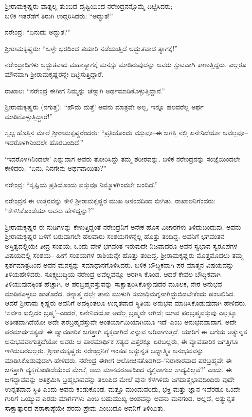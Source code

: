 ಶ್ರೀರಾಮಕೃಷ್ಣರು ವಾತ್ಸಲ್ಯ ತುಂಬಿದ ದೃಷ್ಟಿಯಿಂದ ನರೇಂದ್ರನನ್ನೊಮ್ಮೆ ದಿಟ್ಟಿಸಿದರು;\\ಬಳಿಕ ಇತರೆಡೆಗೆ ತಿರುಗಿ ಉದ್ಗರಿಸಿದರು: “ಅದ್ಭುತ!”

ನರೇಂದ್ರ: “ಏನುದು ಅದ್ಭುತ?”

ಶ್ರೀರಾಮಕೃಷ್ಣರು: “ಒಳ್ಳೇ ಭರದಿಂದ ತಯಾರಿ ನಡೆಯುತ್ತಿದೆ ಅದ್ಭುತವಾದ ತ್ಯಾಗಕ್ಕೆ!”

ನರೇಂದ್ರಾದಿಗಳು ಅದ್ಭುತವಾದ ಮಹಾತ್ಯಾಗಕ್ಕೆ ಮನಸ್ಸು ಮಾಡಿರುವುದನ್ನು ಅವರು ಸ್ಫುಟವಾಗಿ ಕಾಣುತ್ತಿದ್ದರು. ಎಲ್ಲರೂ ಮೌನವಾಗಿ ಶ್ರೀರಾಮಕೃಷ್ಣರನ್ನೇ ದಿಟ್ಟಿಸುತ್ತಿದ್ದಾರೆ.

ರಾಖಾಲ: “ನರೇಂದ್ರ ಈಗೀಗ ನಿಮ್ಮನ್ನು ಚೆನ್ನಾಗಿ ಅರ್ಥಮಾಡಿಕೊಳ್ಳುತ್ತಿದ್ದಾನೆ.”

ಶ್ರೀರಾಮಕೃಷ್ಣರು (ನಗುತ್ತ): “ಹೌದು ಮತ್ತೆ! ಅವನು ಮಾತ್ರವೇ ಅಲ್ಲ, ಇನ್ನೂ ಹಲವರೆಲ್ಲ ಅರ್ಥ ಮಾಡಿಕೊಳ್ಳುತ್ತಿದ್ದಾರೆ!”

ಸ್ವಲ್ಪ ಹೊತ್ತಿನ ಮೇಲೆ ಶ್ರೀರಾಮಕೃಷ್ಣರೆಂದರು: “ಪ್ರತಿಯೊಂದು ವಸ್ತುವೂ–ಈ ಜಗತ್ತಿ ನಲ್ಲಿ ಏನೇನಿದೆಯೋ ಅವೆಲ್ಲವೂ–ಇದರೊಳಗಿನಿಂದಲೇ ಹೊರಬಂದಿದೆ.”

‘ಇದರೊಳಗಿನಿಂದಲೇ’ ಎನ್ನುವಾಗ ಅವರು ತೋರಿಸಿದ್ದು ತಮ್ಮ ಶರೀರವನ್ನು. ಬಳಿಕ ನರೇಂದ್ರನನ್ನು ಸಂಜ್ಞೆಯಿಂದಲೇ ಕೇಳಿದರು: “ಏನು, ನಿನಗೇನು ಅರ್ಥವಾಯಿತು?”

ನರೇಂದ್ರ: “ಸೃಷ್ಟಿಯ ಪ್ರತಿಯೊಂದು ವಸ್ತುವೂ ನಿಮ್ಮೊಳಗಿಂದಲೇ ಬಂದಿದೆ.”

ನರೇಂದ್ರನ ಈ ಉತ್ತರವನ್ನು ಕೇಳಿ ಶ್ರೀರಾಮಕೃಷ್ಣರ ಮುಖ ಆನಂದದಿಂದ ಬೀಗಿತು. ರಾಖಾಲನಿಗೆಂದರು: “ಕೇಳಿಸಿಕೊಂಡೆಯಾ ಅವನು ಹೇಳಿದ್ದನ್ನು?”

ಶ್ರೀರಾಮಕೃಷ್ಣರ ಈ ನುಡಿಗಳನ್ನು ಕೇಳುತ್ತಿದ್ದಂತೆ ನರೇಂದ್ರನಿಗೆ ಅನೇಕ ಹೊಸ ವಿಚಾರಗಳು ತಿಳಿದುಬಂದುವು. ಅವನು ಶ್ರೀರಾಮಕೃಷ್ಣರ ಬಳಿಗೆ ಬರುವಾಗಲೇ ಹಲವಾರು ಸಂಶಯಗಳನ್ನೆಲ್ಲ ಹೊತ್ತು ತಂದಿದ್ದ. ಅವನಿಗೆ ಭಗವಂತನ ಅಸ್ತಿತ್ವದಲ್ಲಿಯೇ ತೀವ್ರ ಸಂಶಯ; ಒಂದು ವೇಳೆ ಭಗವಂತ ಇರುವುದೇ ನಿಜವಾದರೂ ಅವನ ಸ್ವಭಾವ-ಸ್ವರೂಪಗಳ ವಿಷಯದಲ್ಲಿ ಸಂಶಯ– ಹೀಗೆ ಸಂಶಯಗಳ ರಾಶಿಯನ್ನೇ ಹೊತ್ತು ತಂದಿದ್ದ. ಶ್ರೀರಾಮಕೃಷ್ಣರು ಮೊತ್ತಮೊದಲು ತಮ್ಮ ಸ್ಪರ್ಶಮಾತ್ರದಿಂದ ಅವನ ಮನಸ್ಸನ್ನು ಸಮಾಧಾನಗೊಳಿಸಿದರು. ಬಳಿಕ ಬೌದ್ಧಿಕವಾಗಿ ಪರ ಮಾತ್ಮನ ವಿಷಯವನ್ನು ತಿಳಿಯಹೇಳಿದರು. ಸೂಕ್ಷ್ಮಬುದ್ಧಿಯ ನರೇಂದ್ರ ಅವೆಲ್ಲವನ್ನೂ ಅರಗಿಸಿ ಕೊಂಡ. ಆದರೆ ಕೇವಲ ಬೌದ್ಧಿಕವಾಗಿ ತಿಳಿಯುವುದಕ್ಕಿಂತ ಹೆಚ್ಚಾಗಿ, ಆ ಪರಬ್ರಹ್ಮವಸ್ತುವನ್ನು ಸಾಕ್ಷಾತ್ಕರಿಸಿಕೊಳ್ಳುವುದರ ಮೂಲಕ, ನೇರ ಅನುಭವ ಮಾಡಿಕೊಳ್ಳಲು ಹಾತೊರೆದ. ತನ್ನಾತ್ಮ ದಲ್ಲೇ ತಾನು ಮುಳುಗಿ ಸಮಾಧಿಮಗ್ನನಾಗಿದ್ದುಬಿಡಬೇಕೆಂದು ಹಂಬಲಿಸಿದ. ಆದರೆ ಶ್ರೀರಾಮ ಕೃಷ್ಣರು ಅವನಿಗೆ ಅದಕ್ಕಿಂತಲೂ ಉನ್ನತವಾದ ಸ್ಥಿತಿಯ ಅನುಭವ ಮಾಡಿಸಿಕೊಡುವುದಾಗಿ ಹೇಳಿದರು. ‘ಸರ್ವಂ ಖಲ್ವಿದಂ ಬ್ರಹ್ಮ’–ಎಂದರೆ, ಏನೇನಿದೆಯೋ ಅದೆಲ್ಲ ಬ್ರಹ್ಮವೇ ಆಗಿದೆ; ಯಾವ ಪರಬ್ರಹ್ಮವಸ್ತುವು ಎಲ್ಲಕ್ಕೂ ಅತೀತವಾಗಿದೆಯೋ ಅದೇ ಪರಬ್ರಹ್ಮವಸ್ತುವೇ ಅಂತರ್ಯಾಮಿಯಾಗಿಯೂ ಇದೆ–ಎಂಬ ಅನುಭವವಾದಾಗ, ಅದೇ ಪರಮಾರ್ಥಸತ್ಯವೇ ಈ ವ್ಯಾವಹಾರಿಕ ಜಗತ್ತಾಗಿ ವ್ಯಕ್ತವಾಗಿದೆ ಎನ್ನುವ ಅರಿವಾಗುತ್ತದೆ. ಯಾರಿಗೆ ಈ ಬಗೆಯ ಅತ್ಯುನ್ನತ ಅನುಭವವಾಗುತ್ತದೆಯೋ ಅವರು ಆ ಪಾರಮಾರ್ಥಿಕ ಸತ್ಯದ ಎತ್ತರಕ್ಕೂ ಏರಬಲ್ಲರು, ಈ ವ್ಯಾವಹಾರಿಕ ಜಗತ್ತಿಗೂ ಇಳಿದುಬರಬಲ್ಲರು. ಶ್ರೀರಾಮಕೃಷ್ಣರು ನರೇಂದ್ರನಿಗೆ ಇಂತಹ ಅತ್ಯುನ್ನತ ಆಧ್ಯಾತ್ಮಿಕ ಅನುಭವವನ್ನು ಮಾಡಿಸಿಕೊಡುವುದಾಗಿ ಹೇಳಿದರು. ನರೇಂದ್ರ ಈಗೀಗ ಆಲೋಚಿಸತೊಡಗಿದ–‘ನಿರಾಕಾರವಾದ ಪರಬ್ರಹ್ಮವೇ ಈ ಜಗತ್ತಾಗಿ ವ್ಯಕ್ತಗೊಂಡಿದೆಯೆಂದ ಮೇಲೆ, ಅದು ಮಾನವರೂಪದಿಂದ ವ್ಯಕ್ತವಾಗಲು ಸಾಧ್ಯವಿಲ್ಲವೆ?’ ಎಂದು. ಈ ಜಗದ್ಭಾವವನ್ನು ಅತಿಕ್ರಮಿಸಿ ಬ್ರಹ್ಮಭಾವವನ್ನು ತಲುಪಿದ ಮೇಲೆ ಪುನಃ ಕೆಳಗಿಳಿದು ಜಗದಾತ್ಮಭಾವದಿಂದಿರು ವುದೇ ಉನ್ನತವಾದ ಸ್ಥಿತಿ ಎಂದು ಅವನು ಕಂಡುಕೊಂಡ. ಮತ್ತೂ ಮುಂದುವರಿದು, ಭಕ್ತಿ ಮತ್ತು ಜ್ಞಾನ ಇವೆರಡೂ ಒಂದೇ ಗುರಿಗೆ ಒಯ್ಯುವ ಎರಡು ಮಾರ್ಗಗಳು ಎಂಬ ಬಹುಮುಖ್ಯ ಅಂಶವನ್ನು ಅವನು ಮನಗಂಡ. ಅಲ್ಲದೆ, ಅತ್ಯುನ್ನತ ಸಾಕ್ಷಾತ್ಕಾರದ ಪರಾಕಾಷ್ಠೆಯೇ ಪರಮ ಪ್ರೇಮ ಎಂಬುದೂ ಅವನಿಗೆ ತಿಳಿಯಿತು.

